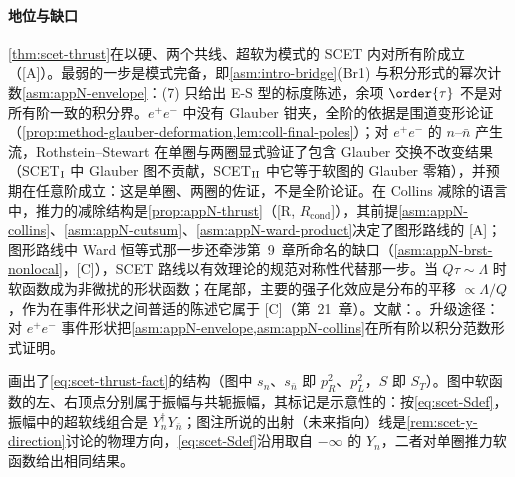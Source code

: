 \paragraph{地位与缺口}
\cref{thm:scet-thrust}在以硬、两个共线、超软为模式的 SCET 内对所有阶成立（[A]）。最弱的一步是模式完备，即\cref{asm:intro-bridge}(Br1) 与积分形式的幂次计数\cref{asm:appN-envelope}：(7) 只给出 E-S 型的标度陈述，余项 $\order{\tau}$ 不是对所有阶一致的积分界。$e^+e^-$ 中没有 Glauber 钳夹，全阶的依据是围道变形论证（\cref{prop:method-glauber-deformation,lem:coll-final-poles}）；对 $e^+e^-$ 的 $n$–$\bar n$ 产生流，Rothstein--Stewart 在单圈与两圈显式验证了包含 Glauber 交换不改变结果（SCET$_{\rm I}$ 中 Glauber 图不贡献，SCET$_{\rm II}$ 中它等于软图的 Glauber 零箱），并预期在任意阶成立\cite[第~10.1、10.3~节]{RothsteinStewart2016}：这是单圈、两圈的佐证，不是全阶论证。在 Collins 减除的语言中，推力的减除结构是\cref{prop:appN-thrust}（[R, $R_{\mathrm{cond}}$]），其前提\cref{asm:appN-collins}、\cref{asm:appN-cutsum}、\cref{asm:appN-ward-product}决定了图形路线的 [A]；图形路线中 Ward 恒等式那一步还牵涉第~9~章所命名的缺口（\cref{asm:appN-brst-nonlocal}，[C]），SCET 路线以有效理论的规范对称性代替那一步。当 $Q\tau\sim\Lambda$ 时软函数成为非微扰的形状函数\cite{Korchemsky:1994is,Korchemsky:1999kt,Bauer:2003di}；在尾部，主要的强子化效应是分布的平移 $\propto\Lambda/Q$，作为在事件形状之间普适的陈述它属于 [C]（第~21~章）。文献：\cite{Bauer:2003di,Lee:2006nr,Fleming:2007qr,Schwartz:2007ib,Fleming:2007xt,BecherSchwartz2008,Bauer:2008dt}。升级途径：对 $e^+e^-$ 事件形状把\cref{asm:appN-envelope,asm:appN-collins}在所有阶以积分范数形式证明。

画出了\cref{eq:scet-thrust-fact}的结构（图中 $s_n$、$s_{\bar n}$ 即 $p_R^2$、$p_L^2$，$S$ 即 $S_T$）。图中软函数的左、右顶点分别属于振幅与共轭振幅，其标记是示意性的：按\cref{eq:scet-Sdef}，振幅中的超软线组合是 $Y_n^\dagger Y_{\bar n}$；图注所说的出射（未来指向）线是\cref{rem:scet-y-direction}讨论的物理方向，\cref{eq:scet-Sdef}沿用取自 $-\infty$ 的 $Y_n$，二者对单圈推力软函数给出相同结果。

